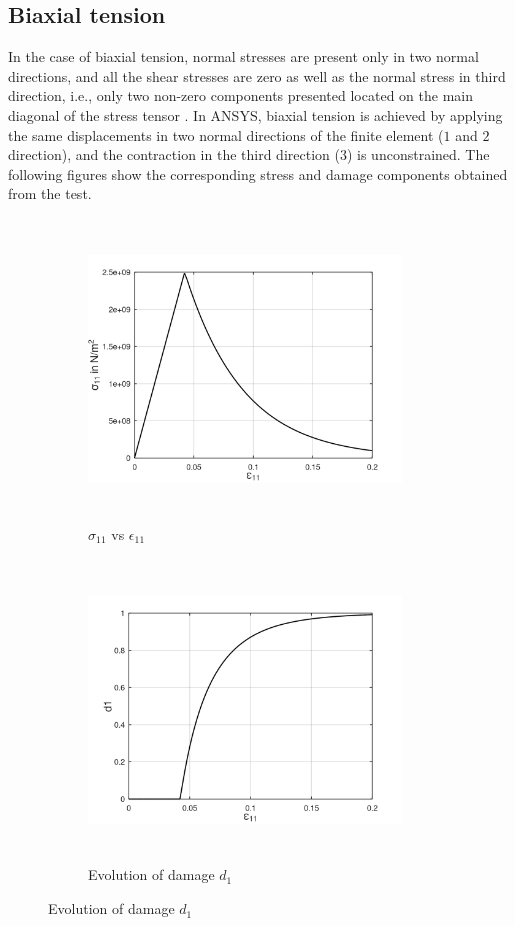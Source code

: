 \documentclass[12pt,a4paper,twoside,openright]{report}
\begin{document}
\subsection{Biaxial tension}
\indent\indent\indent  In the case of biaxial tension, normal stresses are present only in two normal directions, and all the shear stresses are zero as well as the normal stress in third direction, i.e., only two non-zero components presented located on the main diagonal of the stress tensor \citep{ubt}. In ANSYS, biaxial tension is achieved by applying the same displacements in two normal directions of the finite element ($1$ and $2$ direction), and the contraction in the third direction ($3$) is unconstrained. The following figures show the corresponding stress and damage components obtained from the test.
\begin{figure}[hbt!]
     \captionsetup[subfigure]{justification=centering}
     \begin{subfigure}{0.4\textwidth}
         \includegraphics[width=8.3cm,height=8cm,keepaspectratio]{23.S11vsE11.png}
         \caption{$\sigma_{11}$ vs $\epsilon_{11}$}
         \label{fig:S11vsE11}
     \end{subfigure}
	\hspace{1.8cm}
     \captionsetup[subfigure]{justification=centering}
     \begin{subfigure}{0.4\textwidth}
         \includegraphics[width=8.3cm,height=8cm,keepaspectratio]{23.d1.png}
         \caption{Evolution of damage $d_{1}$}
         \label{fig:Evolution of damage d1}
     \end{subfigure}
\end{figure}
\end{document}
